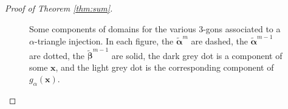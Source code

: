 \documentclass[11pt]{article}
\theoremstyle{plain} \newtheorem{thm}{Theorem}[subsection]
\theoremstyle{plain} \newtheorem{cor}[thm]{Corollary}
\theoremstyle{plain} \newtheorem{prop}[thm]{Proposition}
\theoremstyle{plain} \newtheorem{conj}[thm]{Conjecture}
\theoremstyle{plain} \newtheorem{lem}[thm]{Lemma}
\theoremstyle{definition} \newtheorem{df}[thm]{Definition}
\theoremstyle{remark} \newtheorem{rmk}[thm]{Remark}
\theoremstyle{remark} \newtheorem{obs}[thm]{Observation}
\newcommand{\tld}[1]{\widetilde{#1}}
\newcommand{\bat}{\boldsymbol{\tld{\alpha}}}
\newcommand{\bbt}{\boldsymbol{\tld{\beta}}}
\newcommand{\bx}{\mathbf{x}}
\numberwithin{equation}{section}
\begin{document}
\begin{proof}[Proof of Theorem \ref{thm:sum}]
\begin{figure}[h!]
\caption[Components of domains of 3-gons associated to $g_{\alpha}$ in the proof of Theorem \ref{thm:sum}]{Some components of domains for the various 3-gons associated to a $\alpha$-triangle injection.  In each figure, the $\bat^m$ are dashed, the $\bat^{m-1}$ are dotted, the $\bbt^{m-1}$ are solid, the dark grey dot is a component of some $\bx$, and the light grey dot is the corresponding component of $g_\alpha(\bx)$. \label{fig:CStriA}}
\end{figure}


\end{proof}
\end{document}
